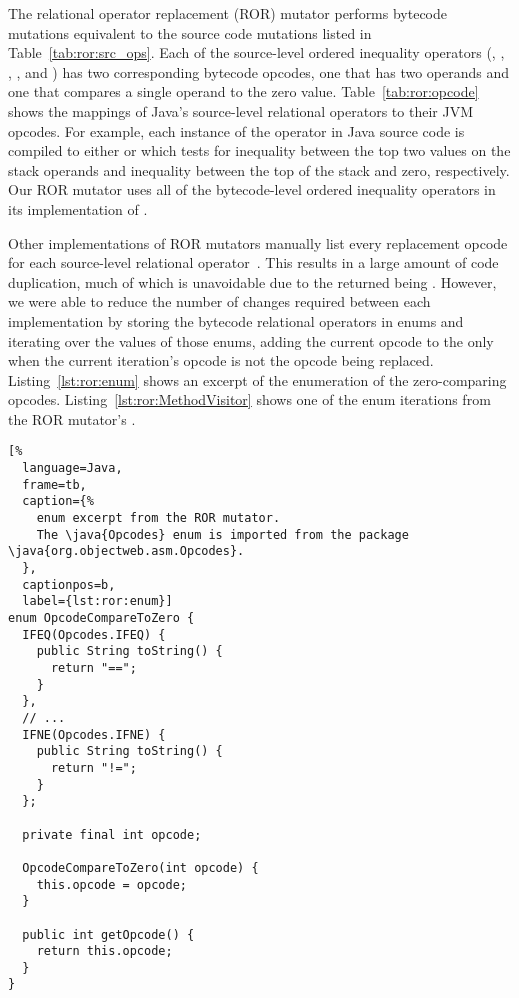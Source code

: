 The relational operator replacement (ROR) mutator performs bytecode mutations equivalent to the source code mutations listed in Table~\ref{tab:ror:src_ops}.
Each of the source-level ordered inequality operators (\java{>}, \java{>=}, \java{==}, \java{<=}, and \java{<}) has two corresponding bytecode opcodes, one that has two operands and one that compares a single operand to the zero value.
Table~\ref{tab:ror:opcode} shows the mappings of Java's source-level relational operators to their JVM opcodes.
For example, each instance of the \java{!=} operator in Java source code is compiled to either  or  which tests for inequality between the top two values on the stack operands and inequality between the top of the stack and zero, respectively.
Our ROR mutator uses all of the bytecode-level ordered inequality operators in its implementation of .

Other implementations of ROR mutators manually list every replacement opcode for each source-level relational operator~\cite{ProdigyXable}.
This results in a large amount of code duplication, much of which is unavoidable due to the  returned being .
However, we were able to reduce the number of changes required between each implementation by storing the bytecode relational operators in enums and iterating over the values of those enums, adding the current opcode to the  only when the current iteration's opcode is not the opcode being replaced.
Listing~\ref{lst:ror:enum} shows an excerpt of the enumeration of the zero-comparing opcodes.
Listing~\ref{lst:ror:MethodVisitor} shows one of the enum iterations from the ROR mutator's .

\begin{lstlisting}[%
  language=Java,
  frame=tb,
  caption={%
    enum excerpt from the ROR mutator.
    The \java{Opcodes} enum is imported from the package \java{org.objectweb.asm.Opcodes}.
  },
  captionpos=b,
  label={lst:ror:enum}]
enum OpcodeCompareToZero {
  IFEQ(Opcodes.IFEQ) {
    public String toString() {
      return "==";
    }
  },
  // ...
  IFNE(Opcodes.IFNE) {
    public String toString() {
      return "!=";
    }
  };

  private final int opcode;

  OpcodeCompareToZero(int opcode) {
    this.opcode = opcode;
  }

  public int getOpcode() {
    return this.opcode;
  }
}
\end{lstlisting}

